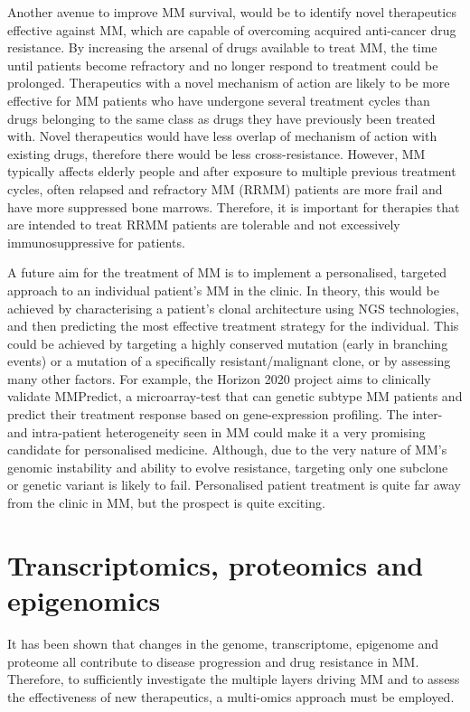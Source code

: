 Another avenue to improve MM survival, would be to identify novel therapeutics effective against MM, which are capable of overcoming acquired
anti-cancer drug resistance.
By increasing the arsenal of drugs available to treat MM, the time until patients become refractory and no longer respond to treatment could be prolonged.
Therapeutics with a novel mechanism of action are likely to be more effective for MM patients who have undergone several treatment cycles than drugs belonging to the same class as drugs they have previously been treated with.
Novel therapeutics would have less overlap of mechanism of action with existing drugs, therefore there would be less cross-resistance.
However, MM typically affects elderly people and after exposure to multiple previous treatment cycles, often relapsed and refractory MM (RRMM) patients are more frail and have more suppressed bone marrows.
Therefore, it is important for therapies that are intended to treat RRMM patients are tolerable and not excessively immunosuppressive for patients.

A future aim for the treatment of MM is to implement a personalised, targeted approach to an individual patient's MM in the clinic.
In theory, this would be achieved by characterising a patient's clonal architecture using NGS technologies, and then predicting the most effective treatment strategy for the individual.
This could be achieved by targeting a highly conserved mutation (early in branching events) or a mutation of a specifically resistant/malignant clone, or by assessing many other factors.
For example, the Horizon 2020 project aims to clinically validate MMPredict, a microarray-test that can genetic subtype MM patients and predict their treatment response based on gene-expression profiling\cite{horizon2020}.
The inter- and intra-patient heterogeneity seen in MM could make it a very promising candidate for personalised medicine.
Although, due to the very nature of MM's genomic instability and ability to evolve resistance, targeting only one subclone or genetic variant is likely to fail.
Personalised patient treatment is quite far away from the clinic in MM, but the prospect is quite exciting.

%
\afterpage{\clearpage} %
%
\section{Transcriptomics, proteomics and epigenomics}
It has been shown that changes in the genome, transcriptome, epigenome and proteome all contribute to disease progression and drug resistance in MM.
Therefore, to sufficiently investigate the multiple layers driving MM and to assess the effectiveness of new therapeutics, a multi-omics approach must be employed.

